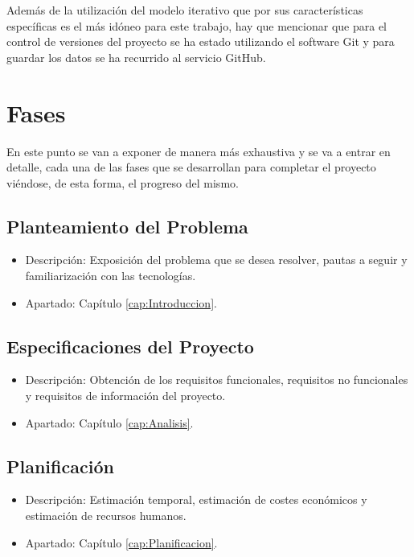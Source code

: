 Además de la utilización del modelo iterativo que por sus características específicas es el más idóneo para este trabajo, hay que mencionar que para el control de versiones del proyecto se ha estado utilizando el software Git y para guardar los datos se ha recurrido al servicio GitHub.

\section{Fases}
En este punto se van a exponer de manera más exhaustiva y se va a entrar en detalle, cada una de las fases que se desarrollan para completar el proyecto viéndose, de esta forma, el progreso del mismo.

\subsection{Planteamiento del Problema}
\begin{itemize}
  \item Descripción: Exposición del problema que se desea resolver, pautas a seguir y familiarización con las tecnologías.
  \item Apartado: Capítulo \ref{cap:Introduccion}.\\
\end{itemize}

\subsection{Especificaciones del Proyecto}
\begin{itemize}
  \item Descripción: Obtención de los requisitos funcionales, requisitos no funcionales y requisitos de información del proyecto.
  \item Apartado: Capítulo \ref{cap:Analisis}.\\
\end{itemize}

\subsection{Planificación}
\begin{itemize}
  \item Descripción: Estimación temporal, estimación de costes económicos y estimación de recursos humanos.
  \item Apartado: Capítulo \ref{cap:Planificacion}.\\
\end{itemize}


